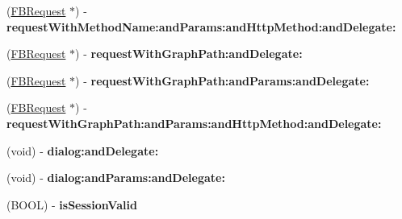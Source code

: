 \begin{DoxyCompactItemize}
\item 
\hypertarget{interface_facebook_abdd8888ceec0cc9641b3939345cb71bb}{
(\hyperlink{interface_f_b_request}{\-F\-B\-Request} $\ast$) -\/ {\bfseries request\-With\-Method\-Name\-:and\-Params\-:and\-Http\-Method\-:and\-Delegate\-:}}
\label{interface_facebook_abdd8888ceec0cc9641b3939345cb71bb}

\item 
\hypertarget{interface_facebook_ade34a729c134bba23ad8a432346a52b3}{
(\hyperlink{interface_f_b_request}{\-F\-B\-Request} $\ast$) -\/ {\bfseries request\-With\-Graph\-Path\-:and\-Delegate\-:}}
\label{interface_facebook_ade34a729c134bba23ad8a432346a52b3}

\item 
\hypertarget{interface_facebook_a01d3d35b70775982c37d68a53b911438}{
(\hyperlink{interface_f_b_request}{\-F\-B\-Request} $\ast$) -\/ {\bfseries request\-With\-Graph\-Path\-:and\-Params\-:and\-Delegate\-:}}
\label{interface_facebook_a01d3d35b70775982c37d68a53b911438}

\item 
\hypertarget{interface_facebook_a735024bca08b871be8fb5a7660ed56b5}{
(\hyperlink{interface_f_b_request}{\-F\-B\-Request} $\ast$) -\/ {\bfseries request\-With\-Graph\-Path\-:and\-Params\-:and\-Http\-Method\-:and\-Delegate\-:}}
\label{interface_facebook_a735024bca08b871be8fb5a7660ed56b5}

\item 
\hypertarget{interface_facebook_afb28ba8c9088bea131e780cbf7a34839}{
(void) -\/ {\bfseries dialog\-:and\-Delegate\-:}}
\label{interface_facebook_afb28ba8c9088bea131e780cbf7a34839}

\item 
\hypertarget{interface_facebook_a1912857d2083d698ee82dfe17346e6a4}{
(void) -\/ {\bfseries dialog\-:and\-Params\-:and\-Delegate\-:}}
\label{interface_facebook_a1912857d2083d698ee82dfe17346e6a4}

\item 
\hypertarget{interface_facebook_a6178476bc78da9727d4f2b32b9663a9a}{
(\-B\-O\-O\-L) -\/ {\bfseries is\-Session\-Valid}}
\label{interface_facebook_a6178476bc78da9727d4f2b32b9663a9a}

\end{DoxyCompactItemize}
